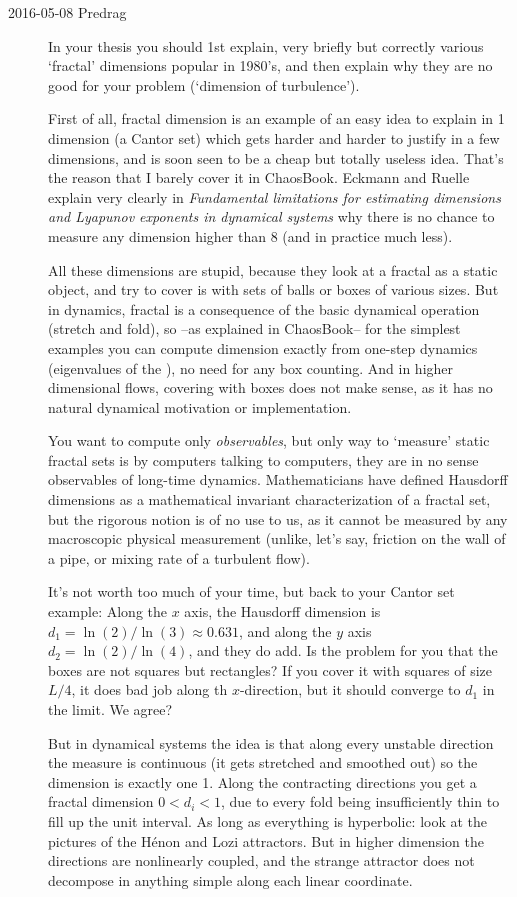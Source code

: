 \begin{description}
\item[2016-05-08 Predrag]
In your thesis you should 1st explain, very briefly but correctly
various `fractal' dimensions popular in 1980's, and then explain why
they are no good for your problem (`dimension of turbulence').

                                                            \toCB
First of all, fractal dimension is an example of an easy idea to explain
in 1 dimension (a Cantor set) which gets harder and harder to justify in
a few dimensions, and is soon seen to be a cheap but totally useless
idea. That's the reason that I barely cover it in ChaosBook. Eckmann and
Ruelle explain very clearly in {\em Fundamental
limitations for estimating dimensions and {Lyapunov} exponents in
dynamical systems} why there is no chance to measure any dimension higher
than 8 (and in practice much less).

All these dimensions are stupid, because they look at a fractal as
a static object, and try to cover is with sets of balls or boxes of
various sizes. But in dynamics, fractal is a consequence of the basic
dynamical operation (stretch and fold), so --as explained in ChaosBook--
for the simplest examples you can compute dimension exactly from one-step
dynamics (eigenvalues of the {\FPoper}), no need for any box counting.
And in higher dimensional flows, covering with boxes does not make sense,
as it has no natural dynamical motivation or implementation.

You want to compute only \emph{observables}, but only way to `measure'
static fractal sets is by computers talking to computers, they are in no
sense observables of long-time dynamics. Mathematicians have defined
Hausdorff dimensions as a mathematical invariant characterization of a
fractal set, but the rigorous notion is of no use to us, as it cannot be
measured by any macroscopic physical measurement (unlike, let's say,
friction on the wall of a pipe, or mixing rate of a turbulent flow).

It's not worth too much of your time, but back to your Cantor set example:
Along the $x$ axis, the Hausdorff dimension is $d_1 = \ln(2)/\ln(3)
\approx 0.631$, and along the $y$ axis $d_2 = \ln(2)/\ln(4)$, and they do
add. Is the problem for you that the boxes are not squares but rectangles?
If you cover it with squares of size $L/4$, it does bad job along th
$x$-direction, but it should converge to $d_1$ in the limit.
We agree?

But in dynamical systems the idea is that along every unstable direction
the measure is continuous (it gets stretched and smoothed out) so the
dimension is exactly one 1. Along the contracting directions you get a
fractal dimension $0 < d_i < 1$, due to every fold being insufficiently
thin to fill up the unit interval. As long as everything is hyperbolic:
look at the pictures of the H\'enon and Lozi attractors. But in higher
dimension the directions are nonlinearly coupled, and the strange
attractor does not decompose in anything simple along each linear
coordinate.


\end{description}
